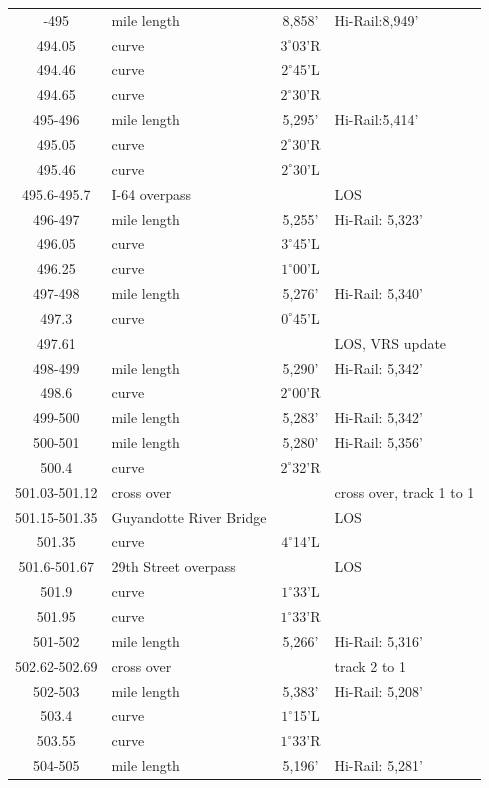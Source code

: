 \begin{center}
\begin{longtable}{c l c l}
\bottomrule
\endlastfoot
494-495 & mile length & 8,858' &  Hi-Rail:8,949' \\
	494.05&curve&$3^{\circ}$03'R&\\
	494.46&curve&$2^{\circ}$45'L&\\
	494.65&curve&$2^{\circ}$30'R&\\
495-496 & mile length & 5,295' &  Hi-Rail:5,414' \\
	495.05&curve&$2^{\circ}$30'R&\\
	495.46&curve&$2^{\circ}$30'L&\\
	495.6-495.7&I-64 overpass&&LOS\\
\hline
496-497 & mile length & 5,255' &  Hi-Rail: 5,323' \\	
	496.05&curve&$3^{\circ}$45'L&\\
	496.25&curve&$1^{\circ}$00'L&\\
497-498 & mile length & 5,276' &  Hi-Rail: 5,340' \\
	497.3&curve&$0^{\circ}$45'L&\\
	497.61& & & LOS, VRS update\\
498-499 & mile length & 5,290' &  Hi-Rail: 5,342' \\
	498.6&curve&$2^{\circ}$00'R&\\
499-500 & mile length & 5,283' &  Hi-Rail: 5,342' \\
500-501 & mile length & 5,280' &  Hi-Rail: 5,356' \\
	500.4&curve&$2^{\circ}$32'R&\\
\hline
	501.03-501.12&cross over&&cross over, track 1 to 1\\
	501.15-501.35&Guyandotte River Bridge&&LOS\\
	501.35&curve&$4^{\circ}$14'L&\\
	501.6-501.67&29th Street overpass&&LOS\\
	501.9&curve&$1^{\circ}$33'L&\\
	501.95&curve&$1^{\circ}$33'R&\\
501-502 & mile length & 5,266' &  Hi-Rail: 5,316' \\
	502.62-502.69&cross over&&track 2 to 1\\
502-503 & mile length & 5,383' &  Hi-Rail: 5,208' \\
	503.4&curve&$1^{\circ}$15'L&\\
	503.55&curve&$1^{\circ}$33'R&\\
504-505 & mile length & 5,196' &  Hi-Rail: 5,281' \\

\end{longtable}
\end{center}
